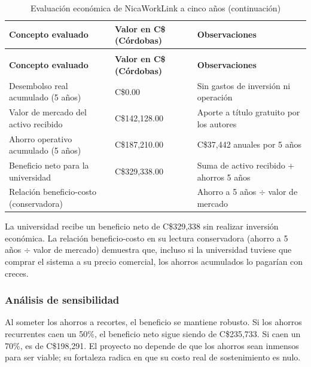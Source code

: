 \begin{longtable}{@{}>{\raggedright\arraybackslash}p{5.5cm}>{\raggedright\arraybackslash}p{3.5cm}>{\raggedright\arraybackslash}p{5cm}@{}}
\caption{Evaluación económica de NicaWorkLink a cinco años}\label{tab:evaluacion-economica}\\
\hline
\textbf{Concepto evaluado} & \textbf{Valor en C\$ (Córdobas)} & \textbf{Observaciones} \\
\hline
\endfirsthead
\caption[]{Evaluación económica de NicaWorkLink a cinco años (continuación)}\\
\hline
\textbf{Concepto evaluado} & \textbf{Valor en C\$ (Córdobas)} & \textbf{Observaciones} \\
\hline
\endhead
\hline
\endlastfoot
Desembolso real acumulado (5 años) & C\$0.00 & Sin gastos de inversión ni operación \\
\hline
Valor de mercado del activo recibido & C\$142,128.00 & Aporte a título gratuito por los autores \\
\hline
Ahorro operativo acumulado (5 años) & C\$187,210.00 & C\$37,442 anuales por 5 años \\
\hline
Beneficio neto para la universidad & C\$329,338.00 & Suma de activo recibido + ahorros 5 años \\
\hline
Relación beneficio-costo (conservadora) & 1.32 & Ahorro a 5 años $\div$ valor de mercado \\
\end{longtable}

La universidad recibe un beneficio neto de C\$329,338 sin realizar inversión económica. La relación beneficio-costo en su lectura conservadora (ahorro a 5 años $\div$ valor de mercado) demuestra que, incluso si la universidad tuviese que comprar el sistema a su precio comercial, los ahorros acumulados lo pagarían con creces.

\subsubsection{Análisis de sensibilidad}

Al someter los ahorros a recortes, el beneficio se mantiene robusto. Si los ahorros recurrentes caen un 50\%, el beneficio neto sigue siendo de C\$235,733. Si caen un 70\%, es de C\$198,291. El proyecto no depende de que los ahorros sean inmensos para ser viable; su fortaleza radica en que su costo real de sostenimiento es nulo.

